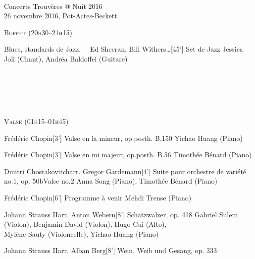 \documentclass[a4paper,11pt,poets,durations]{ConcProg}
\begin{document}
{
\selectfont

~\\

\begin{programme}{
    Concerts Trouvères @ Nuit 2016
\\  {\normalsize 26 novembre 2016, Pot-Actes-Beckett}
}
~\\
\begin{center}
\textsc{Buffet (20h30--21h15)}
\end{center}
  \begin{part}[]
    \begin{composition}{Blues, standards de Jazz, ~~Ed Sheeran, Bill Withers\dots}{}{[45'] Set de Jazz}{}
      {\small Jessica Joli (Chant), Andréa Baldoffei (Guitare)}
    \end{composition}\\
~\\
~\\
~\\
\begin{center}
\textsc{Valse (01h15--01h45)}
\end{center}
    \begin{composition}{Frédéric Chopin}{}{[3'] Valse en la mineur, op.posth. B.150}{}
      {\small Yichao Huang (Piano)}
    \end{composition}
    \begin{composition}{Frédéric Chopin}{}{[3'] Valse en mi majeur, op.posth. B.56}{}
      {\small Timothée Bénard (Piano)}
    \end{composition}
    \begin{composition}{Dmitri Chostakovitch}{arr. Gregor Gardemann}{[4'] Suite pour orchestre de variété no.1, op. 50b}{Valse no.2}
      {\small Anna Song (Piano), Timothée Bénard (Piano)}
    \end{composition}
    \begin{composition}{Frédéric Chopin}{}{[6'] Programme à venir}{}
      {\small Mehdi Trense (Piano)}
    \end{composition}
    \begin{composition}{Johann Strauss II}{arr. Anton Webern}{[8'] Schatzwalzer, op. 418}{}
      {\small Gabriel Sulem (Violon), Benjamin David (Violon), Hugo Cui (Alto),\\Mylène Sauty (Violoncelle), Yichao Huang (Piano)}
    \end{composition}
    \begin{composition}{Johann Strauss II}{arr. Alban Berg}{[8'] Wein, Weib und Gesang, op. 333}{}

\end{composition}
\end{part}
\end{programme}}
\end{document}
